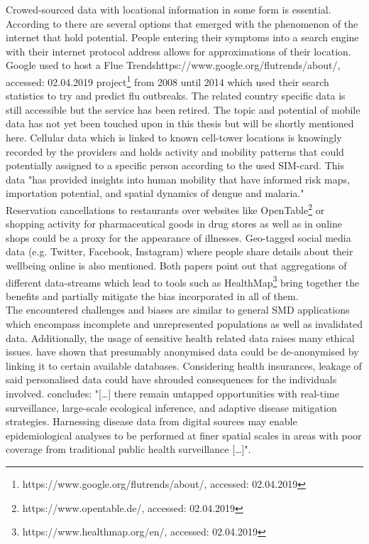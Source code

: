 Crowed-sourced data with locational information in some form is essential. According to \textcite{Lee2016, Schmidt2012} there are several options that emerged with the phenomenon of the internet that hold potential. People entering their symptoms into a search engine with their internet protocol address allows for approximations of their location. Google used to host a Flue Trendshttps://www.google.org/flutrends/about/, accessed: 02.04.2019 project\footnote{https://www.google.org/flutrends/about/, accessed: 02.04.2019} from 2008 until 2014 which used their search statistics to try and predict flu outbreaks. The related country specific data is still accessible but the service has been retired. The topic and potential of mobile data has not yet been touched upon in this thesis but will be shortly mentioned here. Cellular data which is linked to known cell-tower locations is knowingly recorded by the providers and holds activity and mobility patterns that could potentially assigned to a specific person according to the used SIM-card. This data "has provided insights into human mobility that have informed risk maps, importation potential, and spatial dynamics of dengue and malaria." \parencite{Buckee2015b} \\
Reservation cancellations to restaurants over websites like OpenTable\footnote{https://www.opentable.de/, accessed: 02.04.2019} or shopping activity for pharmaceutical goods in drug stores as well as in online shops could be a proxy for the appearance of illnesses. Geo-tagged social media data (e.g. Twitter, Facebook, Instagram) where people share details about their wellbeing online is also mentioned. Both papers point out that aggregations of different data-streams which lead to tools such as HealthMap\footnote{https://www.healthmap.org/en/, accessed: 02.04.2019} bring together the benefits and partially mitigate the bias incorporated in all of them.\\
The encountered challenges and biases are similar to general SMD applications which encompass incomplete and unrepresented populations as well as invalidated data. Additionally, the usage of sensitive health related data raises many ethical issues. \textcite{DeMontjoye2013} have shown that presumably anonymised data could be de-anonymised by linking it to certain available databases. Considering health insurances, leakage of said personalised data could have shrouded consequences for the individuals involved.  
\textcite{Lee2016} concludes: "[\dots] there remain untapped opportunities with real-time surveillance, large-scale ecological inference, and adaptive disease mitigation strategies. Harnessing disease data from digital sources may enable epidemiological analyses to be performed at finer spatial scales in areas with poor coverage from traditional public health surveillance [\dots]".

